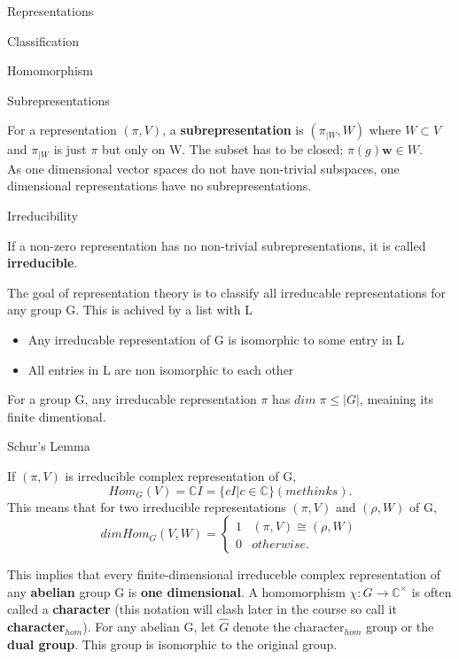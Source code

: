 \documentclass[12pt, letterpaper]{article}
\newcommand{\C}{\mathbb{C}}
\begin{document}
\begin{section}{Representations}
\begin{subsection}{Classification}
\begin{subsubsection}{Homomorphism}
    \end{subsubsection}

    \begin{subsubsection}{Subrepresentations}

      For a representation \((\pi, V)\), a \textbf{subrepresentation} is
      \((\pi_{|W}, W)\) where \(W \subset V\) and \(\pi_{|W}\) is just \(\pi\) but
      only on W. The subset has to be closed; \(\pi(g) \textbf{w} \in W\). \\
      As one dimensional vector spaces do not have non-trivial subspaces, one
      dimensional representations have no subrepresentations.

    \end{subsubsection}

    \begin{subsubsection}{Irreducibility}

      If a non-zero representation has no non-trivial subrepresentations, it is
      called \textbf{irreducible}.

      The goal of representation theory is to classify all irreducable
      representations for any group G. This is achived by a list with L
      \begin{itemize}
        \item Any irreducable representation of G is isomorphic to some entry in
              L
        \item All entries in L are non isomorphic to each other
      \end{itemize}

      For a group G, any irreducable representation \(\pi\) has
      \(dim \; \pi \leq |G|\), meaining its finite dimentional.

    \end{subsubsection}

    \begin{subsubsection}{Schur's Lemma}

      If \((\pi, V)\) is irreducible complex representation of
      G, \[Hom_{G}(V) = \C I = \{cI | c \in \C\} (methinks).\] This means that
      for two irreducible representations \((\pi, V)\) and \((\rho, W)\) of
      G, \[dim Hom_{G}(V, W) =
        \begin{cases}
          1 & (\pi, V) \cong (\rho, W) \\
          0 & otherwise.
        \end{cases}\]

      This implies that every finite-dimensional irreduceble complex
      representation of any \textbf{abelian} group G is \textbf{one
        dimensional}. A homomorphism \(\chi: G \to \C^{\times}\) is often called
      a \textbf{character} (this notation will clash later in the course so call
      it \textbf{character\(_{hom}\)}). For any abelian G, let \(\hat{G}\)
      denote the character\(_{hom}\) group or the \textbf{dual group}. This
      group is isomorphic to the original group.


\end{subsubsection}
\end{subsection}
\end{section}
\end{document}
